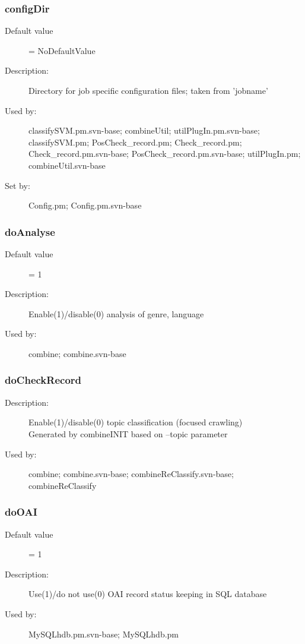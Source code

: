 \subsubsection{configDir}
\label{configDir}
\begin{description}
\item[Default value] = NoDefaultValue
\item[Description:] Directory for job specific configuration files; taken from 'jobname'
\item[Used by:] classifySVM.pm.svn-base; combineUtil; utilPlugIn.pm.svn-base; classifySVM.pm; PosCheck\_record.pm; Check\_record.pm; Check\_record.pm.svn-base; PosCheck\_record.pm.svn-base; utilPlugIn.pm; combineUtil.svn-base
\item[Set by:] Config.pm; Config.pm.svn-base
\end{description}
\subsubsection{doAnalyse}
\label{doAnalyse}
\begin{description}
\item[Default value] = 1
\item[Description:] Enable(1)/disable(0) analysis of genre, language
\item[Used by:] combine; combine.svn-base
\end{description}
\subsubsection{doCheckRecord}
\label{doCheckRecord}
\begin{description}
\item[Description:] Enable(1)/disable(0) topic classification (focused crawling) \\ Generated by combineINIT based on --topic parameter
\item[Used by:] combine; combine.svn-base; combineReClassify.svn-base; combineReClassify
\end{description}
\subsubsection{doOAI}
\label{doOAI}
\begin{description}
\item[Default value] = 1
\item[Description:] Use(1)/do not use(0) OAI record status keeping in SQL database
\item[Used by:] MySQLhdb.pm.svn-base; MySQLhdb.pm
\end{description}
